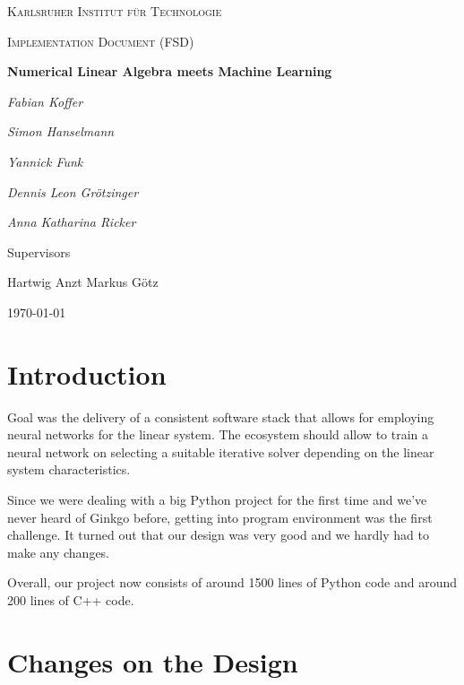 \documentclass[parskip=full]{scrartcl}
\begin{document}
\begin{titlepage}
\centering
{\scshape\LARGE Karlsruher Institut für Technologie\par}
\vspace{1cm}
{\scshape\Large Implementation Document (FSD)\par}
\vspace{1.5cm}
{\huge\bfseries Numerical Linear Algebra meets Machine Learning \par}
\vspace {2cm}

{\Large\itshape Fabian Koffer\par}
{\Large\itshape Simon Hanselmann\par}
{\Large\itshape Yannick Funk\par}
{\Large\itshape Dennis Leon Gr\"{o}tzinger\par}
{\Large\itshape Anna Katharina Ricker\par}

\vfill
Supervisors\par
Hartwig Anzt
Markus G\"{o}tz

\vfill
{\large\today\par}
\end{titlepage}

\tableofcontents
\newpage


\section{Introduction}
Goal was the delivery of a consistent software stack that allows for employing \glspl{neural network} for the linear system. 
The ecosystem should allow to train a \gls{neural network} on selecting a suitable \gls{iterative solver} depending on the linear system characteristics.

Since we were dealing with a big Python project for the first time and we've never heard of Ginkgo before, getting into program environment was the first challenge.
It turned out that our design was very good and we hardly had to make any changes.

Overall, our project now consists of around 1500 lines of Python code and around 200 lines of C++ code.

\section{Changes on the Design}
\end{document}
